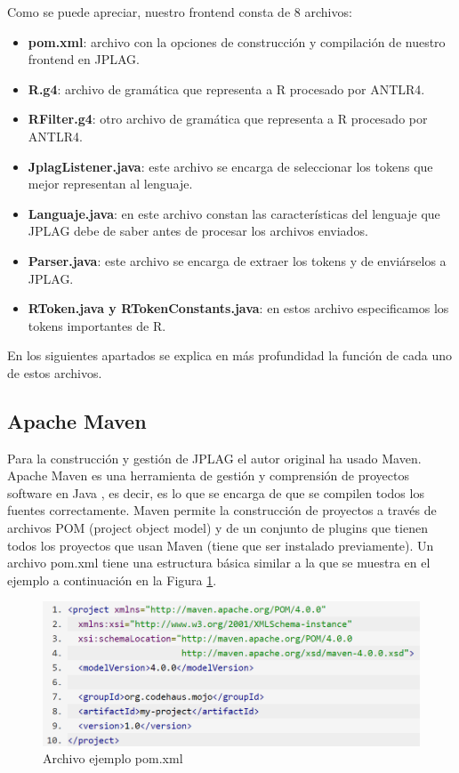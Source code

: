 Como se puede apreciar, nuestro frontend consta de 8 archivos:
\begin{itemize}
\item \textbf{pom.xml}: archivo con la opciones de construcción y compilación de nuestro frontend en JPLAG.
\item \textbf{R.g4}: archivo de gramática que representa a R procesado por ANTLR4.
\item \textbf{RFilter.g4}: otro archivo de gramática que representa a R procesado por ANTLR4.
\item \textbf{JplagListener.java}: este archivo se encarga de seleccionar los tokens que mejor representan al lenguaje.
\item \textbf{Languaje.java}: en este archivo constan las características del lenguaje que JPLAG debe de saber antes de procesar los archivos enviados.
\item \textbf{Parser.java}: este archivo se encarga de extraer los tokens y de enviárselos a JPLAG.
\item \textbf{RToken.java y RTokenConstants.java}: en estos archivo especificamos los tokens importantes de R.
\end{itemize}
En los siguientes apartados se explica en más profundidad la función de cada uno de estos archivos.


\subsection{Apache Maven}

Para la construcción y gestión de JPLAG el autor original ha usado Maven.
\newline
Apache Maven es una herramienta de gestión y comprensión de proyectos software en Java \cite{maven_web}, es decir, es lo que se encarga de que se compilen todos los fuentes correctamente.
\newline
Maven permite la construcción de proyectos a través de archivos POM (project object model) y de un conjunto de plugins que tienen todos los proyectos que usan Maven (tiene que ser instalado previamente).
\newline
Un archivo pom.xml tiene una estructura básica similar a la que se muestra en el ejemplo a continuación en la Figura \ref{fig:ej_POM}.

\begin{figure}[H] %
\centering
\includegraphics[scale=0.55]{imagenes/estructura_POM.png}  %
\caption{Archivo ejemplo pom.xml} \label{fig:ej_POM}
\end{figure}


